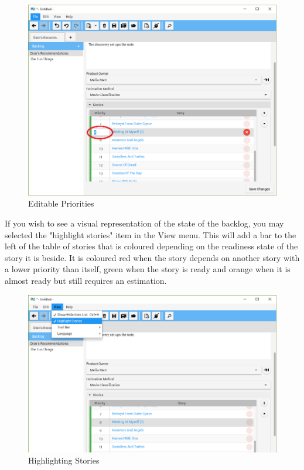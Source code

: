 \begin{figure}[H]
\centering
\includegraphics[width=\textwidth]{images/screenshots/editable_priority.PNG}
\caption{Editable Priorities}
\label{fig:new_project}
\end{figure}

\bigskip
If you wish to see a visual representation of the state of the backlog, you may selected the "highlight stories" item in the View menu. This will add a bar to the left of the table of stories that is coloured depending on the readiness state of the story it is beside. It is coloured red when the story depends on another story with a lower priority than itself, green when the story is ready and orange when it is almost ready but still requires an estimation.

\begin{figure}[H]
\centering
\includegraphics[width=\textwidth]{images/screenshots/story_highlighting.PNG}
\caption{Highlighting Stories}
\label{fig:new_project}
\end{figure}

